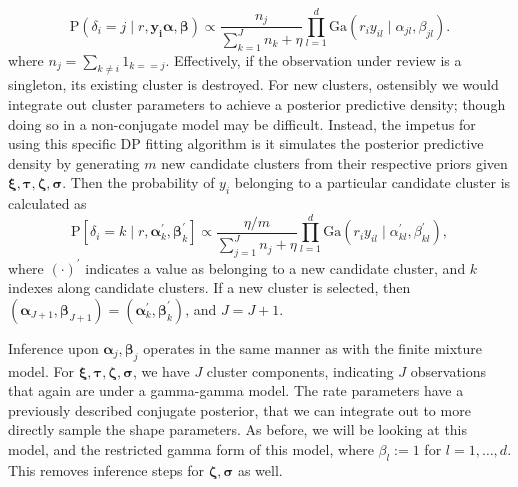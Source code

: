   \begin{equation}
    \label{eqn:dpdelta}
    \text{P}\left(\delta_i = j\mid r, \bm{ y_i} \bm{ \alpha}, \bm{ \beta}\right) \propto
        \frac{n_j}{\sum_{k = 1}^{J} n_k + \eta}
        {\textstyle\prod}_{l = 1}^d\text{Ga}\left(r_iy_{il}\mid\alpha_{jl},\beta_{jl}\right).
  \end{equation}
  where $n_j = {\textstyle\sum}_{k\neq i}1_{k == j}$.  Effectively, if the observation under review is a
  singleton, its existing cluster is destroyed.  For new clusters, ostensibly we would integrate out
  cluster parameters to achieve a posterior predictive density; though doing so in a
  non-conjugate model may be difficult.  Instead, the impetus for using this specific DP fitting algorithm
  is it simulates the posterior predictive density by generating $m$ new candidate clusters from their respective priors given
  $\bm{ \xi,\tau,\zeta,\sigma}$.  Then the probability of $y_i$ belonging to a particular candidate
  cluster is calculated as
  \begin{equation}
    \label{eqn:dpdeltanew}
    \text{P}\left[\delta_i = k\mid r, \bm{ \alpha}_k^{\prime}, \bm{ \beta}_k^{\prime}\right] \propto
        \frac{\eta / m}{\sum_{j = 1}^{J} n_j + \eta}
        {\textstyle\prod}_{l = 1}^d\text{Ga}\left(r_iy_{il}\mid\alpha_{kl}^{\prime},\beta_{kl}^{\prime}\right),
  \end{equation}
  where $(\cdot)^{\prime}$ indicates a value as belonging to a new candidate cluster, and $k$ indexes along candidate clusters.  If a new cluster is selected, then $(\bm{\alpha}_{J+1},\bm{\beta}_{J+1}) = (\bm{\alpha}_k^{\prime},\bm{\beta}_k^{\prime})$, and $J = J + 1$.

Inference upon $\bm{ \alpha}_j,\bm{ \beta}_j$ operates in the same manner as with the finite mixture
  model.  For $\bm{ \xi,\tau,\zeta,\sigma}$, we have $J$ cluster components, indicating $J$
  observations that again are under a gamma-gamma model.  The rate parameters have a previously
  described conjugate posterior, that we can integrate out to more directly sample the shape
  parameters.  As before, we will be looking at this model, and the restricted gamma form of this model, where
  $\beta_l := 1$ for $l = 1,\ldots,d$.  This removes inference steps for $\bm{ \zeta},\bm{ \sigma}$
  as well.

